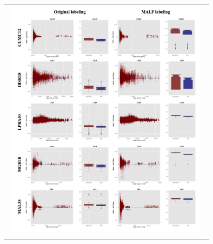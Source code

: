 \documentclass{frontiersSCNS}
\begin{document}
\begin{figure}[htb]
  \centering
  \begin{tabular}{c}
  \includegraphics[width=0.95\textwidth]{evaluation.jpg}
  \end{tabular}
\end{figure}  
\end{document}
